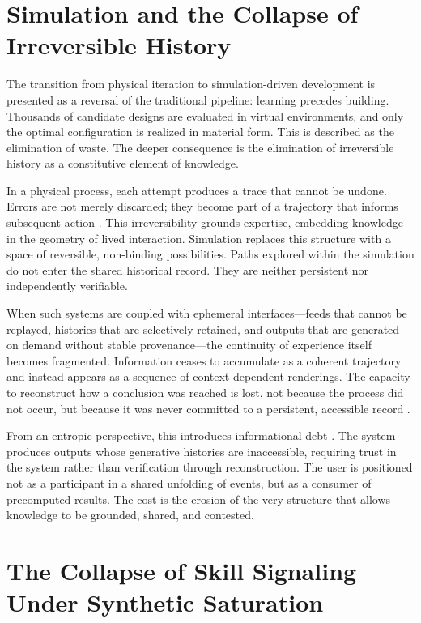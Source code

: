 \documentclass[12pt, a4paper]{article}
\begin{document}
\section{Simulation and the Collapse of Irreversible History}

The transition from physical iteration to simulation-driven development is presented as a reversal of the traditional pipeline: learning precedes building. Thousands of candidate designs are evaluated in virtual environments, and only the optimal configuration is realized in material form. This is described as the elimination of waste. The deeper consequence is the elimination of irreversible history as a constitutive element of knowledge.

In a physical process, each attempt produces a trace that cannot be undone. Errors are not merely discarded; they become part of a trajectory that informs subsequent action \cite{Landauer1961}. This irreversibility grounds expertise, embedding knowledge in the geometry of lived interaction. Simulation replaces this structure with a space of reversible, non-binding possibilities. Paths explored within the simulation do not enter the shared historical record. They are neither persistent nor independently verifiable.

When such systems are coupled with ephemeral interfaces---feeds that cannot be replayed, histories that are selectively retained, and outputs that are generated on demand without stable provenance---the continuity of experience itself becomes fragmented. Information ceases to accumulate as a coherent trajectory and instead appears as a sequence of context-dependent renderings. The capacity to reconstruct how a conclusion was reached is lost, not because the process did not occur, but because it was never committed to a persistent, accessible record \cite{Wiener1948}.

From an entropic perspective, this introduces informational debt \cite{Shannon1948,Jaynes1957}. The system produces outputs whose generative histories are inaccessible, requiring trust in the system rather than verification through reconstruction. The user is positioned not as a participant in a shared unfolding of events, but as a consumer of precomputed results. The cost is the erosion of the very structure that allows knowledge to be grounded, shared, and contested.

\section{The Collapse of Skill Signaling Under Synthetic Saturation}
\end{document}
